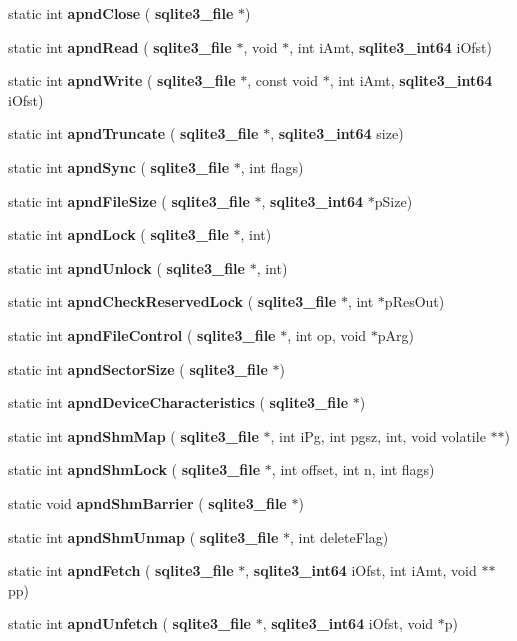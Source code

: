 \begin{DoxyCompactItemize}
\item 
static int \textbf{ apnd\+Close} (\textbf{ sqlite3\+\_\+file} $\ast$)
\item 
static int \textbf{ apnd\+Read} (\textbf{ sqlite3\+\_\+file} $\ast$, void $\ast$, int i\+Amt, \textbf{ sqlite3\+\_\+int64} i\+Ofst)
\item 
static int \textbf{ apnd\+Write} (\textbf{ sqlite3\+\_\+file} $\ast$, const void $\ast$, int i\+Amt, \textbf{ sqlite3\+\_\+int64} i\+Ofst)
\item 
static int \textbf{ apnd\+Truncate} (\textbf{ sqlite3\+\_\+file} $\ast$, \textbf{ sqlite3\+\_\+int64} size)
\item 
static int \textbf{ apnd\+Sync} (\textbf{ sqlite3\+\_\+file} $\ast$, int flags)
\item 
static int \textbf{ apnd\+File\+Size} (\textbf{ sqlite3\+\_\+file} $\ast$, \textbf{ sqlite3\+\_\+int64} $\ast$p\+Size)
\item 
static int \textbf{ apnd\+Lock} (\textbf{ sqlite3\+\_\+file} $\ast$, int)
\item 
static int \textbf{ apnd\+Unlock} (\textbf{ sqlite3\+\_\+file} $\ast$, int)
\item 
static int \textbf{ apnd\+Check\+Reserved\+Lock} (\textbf{ sqlite3\+\_\+file} $\ast$, int $\ast$p\+Res\+Out)
\item 
static int \textbf{ apnd\+File\+Control} (\textbf{ sqlite3\+\_\+file} $\ast$, int op, void $\ast$p\+Arg)
\item 
static int \textbf{ apnd\+Sector\+Size} (\textbf{ sqlite3\+\_\+file} $\ast$)
\item 
static int \textbf{ apnd\+Device\+Characteristics} (\textbf{ sqlite3\+\_\+file} $\ast$)
\item 
static int \textbf{ apnd\+Shm\+Map} (\textbf{ sqlite3\+\_\+file} $\ast$, int i\+Pg, int pgsz, int, void volatile $\ast$$\ast$)
\item 
static int \textbf{ apnd\+Shm\+Lock} (\textbf{ sqlite3\+\_\+file} $\ast$, int offset, int n, int flags)
\item 
static void \textbf{ apnd\+Shm\+Barrier} (\textbf{ sqlite3\+\_\+file} $\ast$)
\item 
static int \textbf{ apnd\+Shm\+Unmap} (\textbf{ sqlite3\+\_\+file} $\ast$, int delete\+Flag)
\item 
static int \textbf{ apnd\+Fetch} (\textbf{ sqlite3\+\_\+file} $\ast$, \textbf{ sqlite3\+\_\+int64} i\+Ofst, int i\+Amt, void $\ast$$\ast$pp)
\item 
static int \textbf{ apnd\+Unfetch} (\textbf{ sqlite3\+\_\+file} $\ast$, \textbf{ sqlite3\+\_\+int64} i\+Ofst, void $\ast$p)

\end{DoxyCompactItemize}
